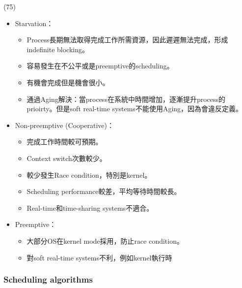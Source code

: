 \begin{theorem}{(75)} \quad\quad \begin{itemize}
        \item Starvation：\begin{itemize}
            \item Process長期無法取得完成工作所需資源，因此遲遲無法完成，形成indefinite blocking。
            \item 容易發生在不公平或是preemptive的scheduling。
            \item 有機會完成但是機會很小。
            \item 通過Aging解決：當process在系統中時間增加，逐漸提升process的prioirty。但是soft real-time systems不能使用Aging，因為會違反定義。
        \end{itemize}
        \item Non-preemptive (Cooperative)：\begin{itemize}
            \item 完成工作時間較可預期。
            \item Context switch次數較少。
            \item 較少發生Race condition，特別是kernel。
            \item Scheduling performance較差，平均等待時間較長。
            \item Real-time和time-sharing systems不適合。
        \end{itemize}
        \item Preemptive：\begin{itemize}
            \item 大部分OS在kernel mode採用，防止race condition。
            \item 對soft real-time systems不利，例如kernel執行時
        \end{itemize}
    \end{itemize}
\end{theorem}

\subsubsection{Scheduling algorithms}

